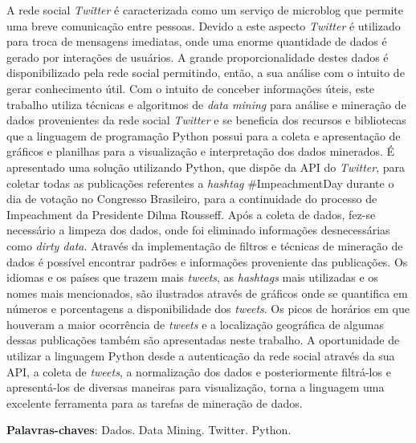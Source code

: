 \begin{resumo}[RESUMO]	
A rede social \textit{Twitter} é caracterizada como um serviço de microblog que permite uma breve comunicação entre pessoas. Devido a este aspecto \textit{Twitter} é utilizado para troca de mensagens imediatas, onde uma enorme quantidade de dados é gerado por interações de usuários. A grande proporcionalidade destes dados é disponibilizado pela rede social permitindo, então, a sua análise com o intuito de gerar conhecimento útil. Com o intuito de conceber informações úteis, este trabalho utiliza técnicas e algoritmos de \textit{data mining} para análise e mineração de dados provenientes da rede social \textit{Twitter} e se beneficia dos recursos e bibliotecas que a linguagem de programação Python possui para a coleta e apresentação de gráficos e planilhas para a visualização e interpretação dos dados minerados. É apresentado uma solução utilizando Python, que dispõe da API do \textit{Twitter}, para coletar todas as publicações referentes a \textit{hashtag} \#ImpeachmentDay durante o dia de votação no Congresso Brasileiro, para a continuidade do processo de Impeachment da Presidente Dilma Rousseff. Após a coleta de dados, fez-se necessário a limpeza dos dados, onde foi eliminado informações desnecessárias como \textit{dirty data}. Através da implementação de filtros e técnicas de mineração de dados é possível encontrar padrões e informações proveniente das publicações. Os idiomas e os países que trazem mais \textit{tweets}, as \textit{hashtags} mais utilizadas e os nomes mais mencionados, são ilustrados através de gráficos onde se quantifica em números e porcentagens a disponibilidade dos \textit{tweets}. Os picos de horários em que houveram a maior ocorrência de \textit{tweets} e a localização geográfica de algumas dessas publicações também são apresentadas neste trabalho. A oportunidade de utilizar a linguagem Python desde a autenticação da rede social através da sua API, a coleta de \textit{tweets}, a normalização dos dados e posteriormente filtrá-los e apresentá-los de diversas maneiras para visualização, torna a linguagem uma excelente ferramenta para as tarefas de mineração de dados.



 \vspace{\onelineskip}
    
 \noindent
 \textbf{Palavras-chaves}: Dados. Data Mining. Twitter. Python.
\end{resumo}
